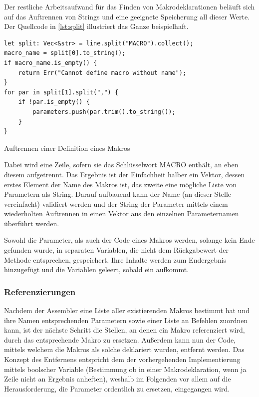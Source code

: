 Der restliche Arbeitsaufwand für das Finden von Makrodeklarationen beläuft sich auf das Auftrennen von Strings und eine geeignete Speicherung all dieser Werte. Der Quellcode in \ref{lst:split} illustriert das Ganze beispielhaft.

\begin{listing}[th]
\begin{verbatim}
let split: Vec<&str> = line.split("MACRO").collect();
macro_name = split[0].to_string();
if macro_name.is_empty() {
    return Err("Cannot define macro without name");
}
for par in split[1].split(",") {
    if !par.is_empty() {
        parameters.push(par.trim().to_string());
    }
}
\end{verbatim}
\label{lst:split}
\caption{Auftrennen einer Definition eines Makros}
\end{listing}

Dabei wird eine Zeile, sofern sie das Schlüsselwort \glqq MACRO\grqq{} enthält, an eben diesem aufgetrennt. Das Ergebnis ist der Einfachheit halber ein Vektor, dessen erstes Element der Name des Makros ist, das zweite eine mögliche Liste von Parametern als String. Darauf aufbauend kann der Name (an dieser Stelle vereinfacht) validiert werden und der String der Parameter mittels einem wiederholten Auftrennen in einen Vektor aus den einzelnen Parameternamen überführt werden.

Sowohl die Parameter, als auch der Code eines Makros werden, solange kein Ende gefunden wurde, in separaten Variablen, die nicht dem Rückgabewert der Methode entsprechen, gespeichert. Ihre Inhalte werden zum Endergebnis hinzugefügt und die Variablen geleert, sobald ein  aufkommt.

\subsubsection{Referenzierungen}

Nachdem der Assembler eine Liste aller existierenden Makros bestimmt hat und ihre Namen entsprechenden Parametern sowie einer Liste an Befehlen zuordnen kann, ist der nächste Schritt die Stellen, an denen ein Makro referenziert wird, durch das entsprechende Makro zu ersetzen. Außerdem kann nun der Code, mittels welchem die Makros als solche deklariert wurden, entfernt werden. Das Konzept des Entfernens entspricht dem der vorhergehenden Implementierung mittels boolscher Variable (Bestimmung ob in einer Makrodeklaration, wenn ja Zeile nicht an Ergebnis anheften), weshalb im Folgenden vor allem auf die Herausforderung, die Parameter ordentlich zu ersetzen, eingegangen wird.

